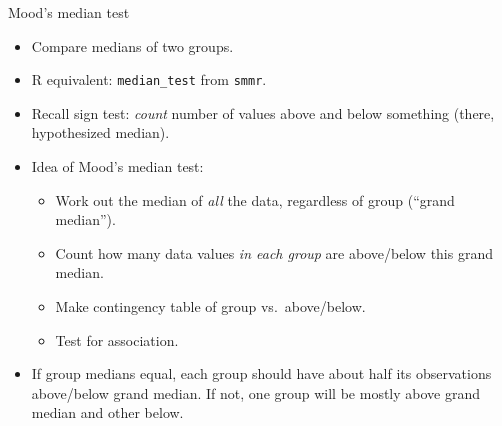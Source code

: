 \documentclass[unknownkeysallowed]{beamer}\usepackage[]{graphicx}\usepackage[]{color}
\begin{document}

\begin{frame}[fragile]{Mood's median test}
  
  \begin{itemize}
  \item Compare medians of two groups.
  \item R equivalent: \texttt{median\_test} from \texttt{smmr}.
  \item Recall sign test: \emph{count} number of values above and
    below something (there, hypothesized median).
  \item Idea of Mood's median test:
    \begin{itemize}
    \item Work out the median of \emph{all} the data, regardless of
      group (``grand median'').
    \item Count how many data values \emph{in each group} are
      above/below this grand median.
    \item Make contingency table of group vs.\ above/below.
    \item Test for association.
    \end{itemize}
  \item If group medians equal, each group should have about half its
    observations above/below grand median. If not, one group will be
    mostly above grand median and other below.
    
  \end{itemize}
  
\end{frame}
\end{document}
